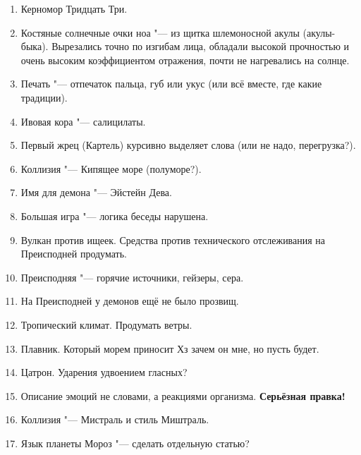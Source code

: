 \documentclass[a4paper,10pt]{book}
\begin{document}
\begin{enumerate}

\item Керномор Тридцать Три.

\item Костяные солнечные очки ноа "--- из щитка шлемоносной акулы (акулы-быка). Вырезались точно по изгибам лица, обладали высокой прочностью и очень высоким коэффициентом отражения, почти не нагревались на солнце.

\item Печать "--- отпечаток пальца, губ или укус (или всё вместе, где какие традиции).

\item Ивовая кора "--- салицилаты.

\item Первый жрец (Картель) курсивно выделяет слова (или не надо, перегрузка?).

\item Коллизия "--- Кипящее море (полуморе?).

\item Имя для демона "--- Эйстейн Дева.

\item Большая игра "--- логика беседы нарушена.

\item Вулкан против ищеек. Средства против технического отслеживания на Преисподней продумать.

\item Преисподняя "--- горячие источники, гейзеры, сера.

\item На Преисподней у демонов ещё не было прозвищ.

\item Тропический климат. Продумать ветры.

\item Плавник. Который морем приносит Хз зачем он мне, но пусть будет.

\item Цатрон. Ударения удвоением гласных?

\item Описание эмоций не словами, а реакциями организма. \textbf{Серьёзная правка!}

\item Коллизия "--- Мистраль и стиль Миштраль.

\item Язык планеты Мороз "--- сделать отдельную статью?


\end{enumerate}
\end{document}
